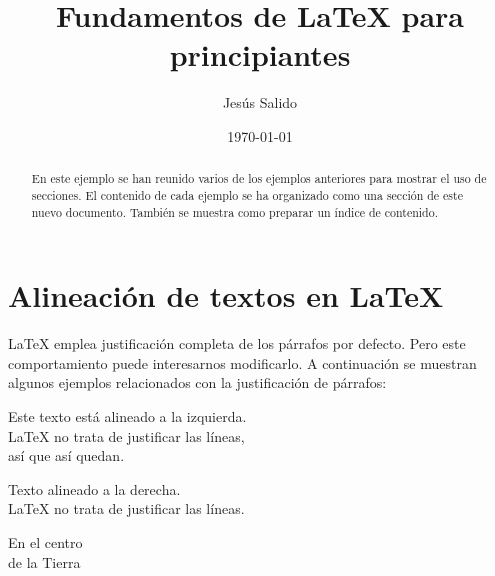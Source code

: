 \documentclass[11pt,a4paper]{article}
\author{Jesús Salido}
\title{Fundamentos de \LaTeX{} para principiantes}
\date{\today}
\begin{document}
\maketitle 

\begin{abstract}
	En este ejemplo se han reunido varios de los ejemplos anteriores para mostrar el uso de secciones. El contenido de cada ejemplo se ha organizado como una sección de este nuevo documento. También se muestra como preparar un índice de contenido.
\end{abstract}



\section{Alineación de textos en \LaTeX{}}
\label{sec:alinea} %

\LaTeX{} emplea justificación completa de los párrafos por defecto. Pero este comportamiento puede interesarnos modificarlo. A continuación se muestran algunos ejemplos relacionados con la justificación de párrafos:

\begin{flushleft}
	Este texto está alineado a la izquierda. \\
	\LaTeX{} no trata de justificar las líneas, \\ 
	así que así quedan.
\end{flushleft}

\begin{flushright}
	Texto alineado a la derecha. \\
	\LaTeX{} no trata de justificar las líneas.
\end{flushright}

\begin{center}
	En el centro\\
	de la Tierra
\end{center}
\end{document}
